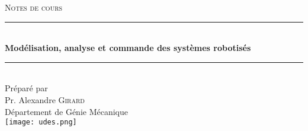 ﻿%

\begin{titlepage}

\center 
 


\textsc{\LARGE 
Notes de cours
}\\[1.5cm] 

\rule{\linewidth}{0.5mm} \\[0.4cm]
{\huge \bfseries 
Modélisation, analyse et commande des systèmes robotisés
}\\[0.4cm] 
\rule{\linewidth}{0.5mm} \\[1.5cm]
 
{\large Préparé par}\\[1cm]
{\LARGE Pr. Alexandre \textsc{Girard} }\\[1cm] 
{\LARGE Département de Génie Mécanique }\\[2cm]

\texttt{[image: udes.png]}\\[1cm] 

\vfill 

\end{titlepage}
\restoregeometry